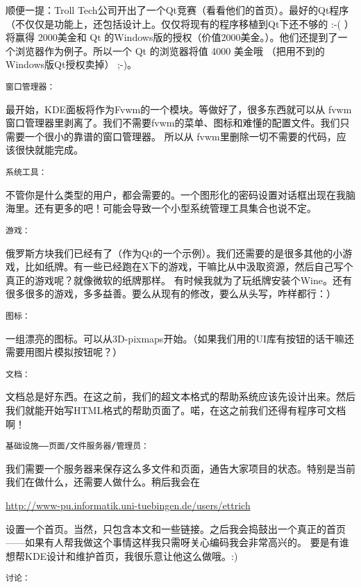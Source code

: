 \documentclass[amstex,twoside]{ctexbook}
\newenvironment{insertnote}{ \ttfamily\CJKfamily{KaiTi} }{\vskip 0.5cm }
\begin{document}
\begin{insertnote}
{    顺便一提：Troll Tech公司开出了一个Qt竞赛（看看他们的首页）。最好的Qt程序（不仅仅是功能上，还包括设计上。仅仅将现有的程序移植到Qt下还不够的 :-( ）将赢得 2000美金和 Qt 的Windows版的授权（价值2000美金。）。他们还提到了一个浏览器作为例子。所以一个 Qt 的浏览器将值 4000 美金哦 （把用不到的 Windows版Qt授权卖掉） ;-)。


{ \noindent \tt 窗口管理器：}

    最开始，KDE面板将作为Fvwm的一个模块。等做好了，很多东西就可以从 fvwm 窗口管理器里剥离了。我们不需要fvwm的菜单、图标和难懂的配置文件。我们只需要一个很小的靠谱的窗口管理器。
    所以从 fvwm里删除一切不需要的代码，应该很快就能完成。


{ \noindent \tt 系统工具：}

    不管你是什么类型的用户，都会需要的。一个图形化的密码设置对话框出现在我脑海里。还有更多的吧！可能会导致一个小型系统管理工具集合也说不定。
    

{ \noindent \tt 游戏：}

    俄罗斯方块我们已经有了（作为Qt的一个示例）。我们还需要的是很多其他的小游戏，比如纸牌。有一些已经跑在X下的游戏，干嘛比从中汲取资源，然后自己写个真正的游戏呢？就像微软的纸牌那样。
    有时候我就为了玩纸牌安装个Wine。还有很多很多的游戏，多多益善。要么从现有的修改，要么从头写，咋样都行：）
    
{ \noindent \tt 图标：}

    一组漂亮的图标。可以从3D-pixmaps开始。（如果我们用的UI库有按钮的话干嘛还需要用图片模拟按钮呢？）
    
{ \noindent \tt 文档：}

	文档总是好东西。在这之前，我们的超文本格式的帮助系统应该先设计出来。然后我们就能开始写HTML格式的帮助页面了。喏，在这之前我们还得有程序可文档啊！

{ \noindent \tt 基础设施——页面/文件服务器/管理员：}

    我们需要一个服务器来保存这么多文件和页面，通告大家项目的状态。特别是当前我们在做什么，还需要人做什么。稍后我会在
    
    	\begin{center}
    	\url{http://www-pu.informatik.uni-tuebingen.de/users/ettrich}
    	\end{center}

设置一个首页。当然，只包含本文和一些链接。之后我会捣鼓出一个真正的首页——如果有人帮我做这个事情这样我只需呀关心编码我会非常高兴的。
要是有谁想帮KDE设计和维护首页，我很乐意让他这么做哦。:)

{ \noindent \tt 讨论：}

}
\end{insertnote}
\end{document}
